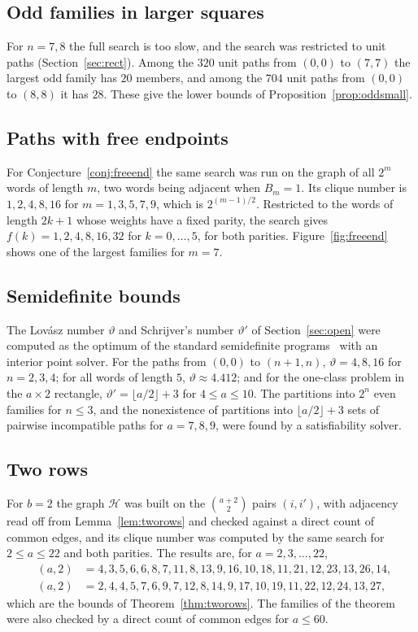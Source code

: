 \documentclass[11pt]{amsart}
\theoremstyle{definition}
\theoremstyle{remark}
\numberwithin{equation}{section}
\DeclareMathOperator{\Meven}{M_{ev}}
\DeclareMathOperator{\Modd}{M_{od}}
\begin{document}
\subsection*{Odd families in larger squares}
For $n=7,8$ the full search is too slow, and the search was restricted to unit paths (Section~\ref{sec:rect}). Among the $320$ unit paths from $(0,0)$ to $(7,7)$ the largest odd family has $20$ members, and among the $704$ unit paths from $(0,0)$ to $(8,8)$ it has $28$. These give the lower bounds of Proposition~\ref{prop:oddsmall}.

\subsection*{Paths with free endpoints}
For Conjecture~\ref{conj:freeend} the same search was run on the graph of all $2^m$ words of length $m$, two words being adjacent when $B_m=1$. Its clique number is $1,2,4,8,16$ for $m=1,3,5,7,9$, which is $2^{(m-1)/2}$. Restricted to the words of length $2k+1$ whose weights have a fixed parity, the search gives $f(k)=1,2,4,8,16,32$ for $k=0,\dots,5$, for both parities. Figure~\ref{fig:freeend} shows one of the largest families for $m=7$.

\subsection*{Semidefinite bounds}
The Lov\'asz number $\vartheta$ and Schrijver's number $\vartheta'$ of Section~\ref{sec:open} were computed as the optimum of the standard semidefinite programs~\cite{Lo,Sc} with an interior point solver. For the paths from $(0,0)$ to $(n+1,n)$, $\vartheta=4,8,16$ for $n=2,3,4$; for all words of length $5$, $\vartheta\approx4.412$; and for the one-class problem in the $a\times2$ rectangle, $\vartheta'=\lfloor a/2\rfloor+3$ for $4\le a\le10$. The partitions into $2^n$ even families for $n\le3$, and the nonexistence of partitions into $\lfloor a/2\rfloor+3$ sets of pairwise incompatible paths for $a=7,8,9$, were found by a satisfiability solver.

\subsection*{Two rows}
For $b=2$ the graph $\mathcal H$ was built on the $\binom{a+2}2$ pairs $(i,i')$, with adjacency read off from Lemma~\ref{lem:tworows} and checked against a direct count of common edges, and its clique number was computed by the same search for $2\le a\le22$ and both parities. The results are, for $a=2,3,\dots,22$,
\begin{align*}
\Meven(a,2)&=4,3,5,6,6,8,7,11,8,13,9,16,10,18,11,21,12,23,13,26,14,\\
\Modd(a,2)&=2,4,4,5,7,6,9,7,12,8,14,9,17,10,19,11,22,12,24,13,27,
\end{align*}
which are the bounds of Theorem~\ref{thm:tworows}. The families of the theorem were also checked by a direct count of common edges for $a\le60$.
\end{document}
